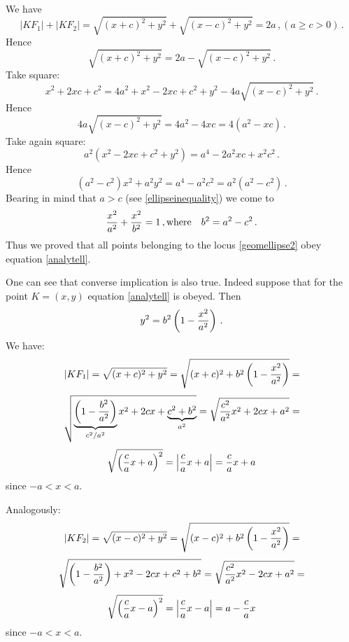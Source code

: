 \documentclass[12pt]{article}
\numberwithin{equation}{section}
\begin{document}
  We have 
     $$
|KF_1|+|KF_2|=
\sqrt{(x+c)^2+y^2}+
\sqrt{(x-c)^2+y^2}=2a\,, (a\geq c>0)\,.
      $$
Hence
\begin{equation}\label{calcforellipse1}
\sqrt{(x+c)^2+y^2}=2a-
\sqrt{(x-c)^2+y^2}\,.
       \end{equation}  
     Take square:
           $$
  x^2+2xc+c^2=4a^2+x^2-2xc+c^2+y^2-4a\sqrt{(x-c)^2+y^2}\,.
        $$
Hence
          $$
  4a\sqrt{(x-c)^2+y^2}=4a^2-4xc=4(a^2-xc)\,.
        $$
Take again square:
          $$
        a^2\left(x^2-2xc+c^2+y^2\right)=
       a^4-2a^2xc+x^2c^2\,.
         $$
Hence
     \begin{equation}\label{calcforellipse2}
 (a^2-c^2)x^2+a^2y^2=a^4-a^2c^2=a^2(a^2-c^2)\,.
     \end{equation}
Bearing in mind that $a>c$ (see \eqref{ellipseinequality})
we come to 
       \begin{equation}\label{ellipseanal2}
     {x^2\over a^2}+{x^2\over b^2}=1\,, {\rm where}\quad
    b^2=a^2-c^2\,.
     \end{equation}
Thus we proved that all points belonging to the 
locus \eqref{geomellipse2} obey equation
\eqref{analytell}.





One can see that converse implication is also true.
Indeed suppose that for the point $K=(x,y)$
equation \eqref{analytell} is obeyed.
  Then $$
   y^2=b^2\left(1-{x^2\over a^2}\right)\,.
       $$
We have:
             $$
|KF_1|=\sqrt{(x+c)^2+y^2}=
\sqrt{(x+c)^2+b^2\left(1-{x^2\over a^2}\right)}=
        $$
        $$
\sqrt{
  \underbrace{\left(1-{b^2\over a^2}\right)}_{c^2/a^2}
   x^2+2cx+
    \underbrace{c^2+b^2}_{a^2}
       }=
\sqrt{{c^2\over a^2}x^2+2cx+a^2}=
           $$
            \begin{equation}\label{calcforellipse3}
   \sqrt{\left({c\over a}x+a\right)^2}
     =\left|{c\over a}x+a\right|={c\over a}x+a
      \end{equation}
 since $-a<x<a$.

Analogously:             $$
|KF_2|=\sqrt{(x-c)^2+y^2}=
\sqrt{(x-c)^2+b^2\left(1-{x^2\over a^2}\right)}=
        $$
        $$
\sqrt{
 {\left(1-{b^2\over a^2}\right)}+
   x^2-2cx+
  {c^2+b^2}}=
\sqrt{{c^2\over a^2}x^2-2cx+a^2}=
           $$
             \begin{equation}\label{calcforellipse4}
   \sqrt{\left({c\over a}x-a\right)^2}
     =\left|{c\over a}x-a\right|=a-{c\over a}x
       \end{equation}
 since $-a<x<a$.
\end{document}
